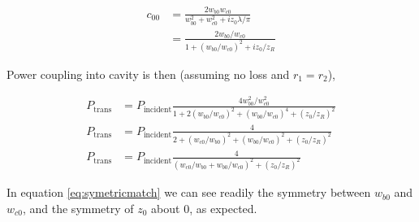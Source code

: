 \begin{align}
    c_{00} &= \frac{2 w_{b0} w_{c0}}{w_{b0}^2 + w_{c0}^2 + i z_0 \lambda / \pi} \nonumber
\\  &= \frac{2 w_{b0} / w_{c0}}{1 + \left( w_{b0} /w_{c0} \right)^2 + i z_0 / z_R}
\end{align}

Power coupling into cavity is then (assuming no loss and $r_1 = r_2$),


\begin{align}
    P_{\mathrm{trans}}  &= P_{\mathrm{incident}} \frac{4 w_{b0}^2 / w_{c0}^2}{1 +
    2 \left( w_{b0} /w_{c0} \right)^2 + \left( w_{b0} /w_{c0} \right)^4 + \left(
    z_0 / z_R \right)^2} \nonumber
\\  P_{\mathrm{trans}}  &= P_{\mathrm{incident}} \frac{4}{ 2 + \left( w_{c0} /
    w_{b0} \right)^2 + \left( w_{b0} /w_{c0} \right)^2 + \left(
    z_0 / z_R \right)^2}
\\  P_{\mathrm{trans}}  &= P_{\mathrm{incident}} \frac{4}{ \left( w_{c0} /
    w_{b0} + w_{b0} / w_{c0} \right)^2 + \left( z_0 / z_R \right)^2}
    \label{eq:symetricmatch}
\end{align}

In equation \ref{eq:symetricmatch} we can see readily the symmetry between
$w_{b0}$ and $w_{c0}$, and the symmetry of $z_0$ about $0$, as expected.
